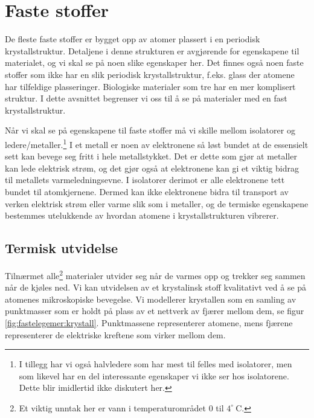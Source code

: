 \chapter{Faste stoffer}
De fleste faste stoffer er bygget opp av atomer plassert i en periodisk krystallstruktur. Detaljene i denne strukturen er avgjørende for egenskapene til materialet, og vi skal se på noen slike egenskaper her. Det finnes også noen faste stoffer som ikke har en slik periodisk krystallstruktur, f.eks. glass der atomene har tilfeldige plasseringer. Biologiske materialer som tre har en mer komplisert struktur. I dette avsnittet begrenser vi oss til å se på materialer med en fast krystallstruktur.

Når vi skal se på egenskapene til faste stoffer må vi skille mellom isolatorer og ledere/metaller.\footnote{I tillegg har vi også halvledere som har mest til felles med isolatorer, men som likevel har en del interessante egenskaper vi ikke ser hos isolatorene. Dette blir imidlertid ikke diskutert her.} I et metall er noen av elektronene så løst bundet at de essensielt sett kan bevege seg fritt i hele metallstykket. Det er dette som gjør at metaller kan lede elektrisk strøm, og det gjør også at elektronene kan gi et viktig bidrag til metallets varmeledningsevne. I isolatorer derimot er alle elektronene tett bundet til atomkjernene. Dermed kan ikke elektronene bidra til transport av verken elektrisk strøm eller varme slik som i metaller, og de termiske egenskapene bestemmes utelukkende av hvordan atomene i krystallstrukturen vibrerer.

\section{Termisk utvidelse}
Tilnærmet alle\footnote{Et viktig unntak her er vann i temperaturområdet 0 til $4^\circ~\mathrm{C}$.} materialer utvider seg når de varmes opp og trekker seg sammen når de kjøles ned. Vi kan  utvidelsen av et krystalinsk stoff kvalitativt ved å se på atomenes mikroskopiske bevegelse. Vi modellerer krystallen som en samling av punktmasser som er holdt på plass av et nettverk av fjærer mellom dem, se figur \ref{fig:fastelegemer:krystall}. Punktmassene representerer atomene, mens fjærene representerer de elektriske kreftene som virker mellom dem. 

